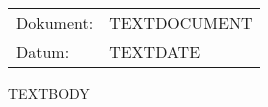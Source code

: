 ﻿\documentclass{scrartcl}
\begin{document}
\begin{tabular}{ @{} p{} p{} @{} }
Dokument:   & TEXTDOCUMENT \\
Datum:      & TEXTDATE \\
\end{tabular}

\vspace{0.5cm}
TEXTBODY
\end{document}
